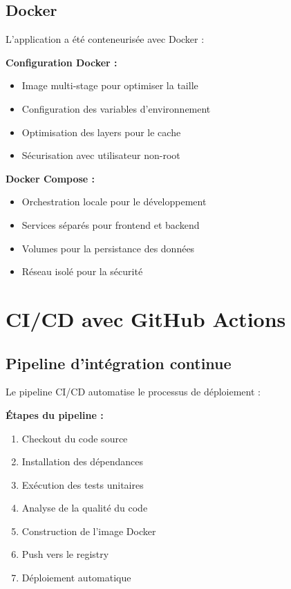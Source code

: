 \subsection{Docker}

L'application a été conteneurisée avec Docker :

\textbf{Configuration Docker :}
\begin{itemize}
    \item Image multi-stage pour optimiser la taille
    \item Configuration des variables d'environnement
    \item Optimisation des layers pour le cache
    \item Sécurisation avec utilisateur non-root
\end{itemize}

\textbf{Docker Compose :}
\begin{itemize}
    \item Orchestration locale pour le développement
    \item Services séparés pour frontend et backend
    \item Volumes pour la persistance des données
    \item Réseau isolé pour la sécurité
\end{itemize}

\section{CI/CD avec GitHub Actions}

\subsection{Pipeline d'intégration continue}

Le pipeline CI/CD automatise le processus de déploiement :

\textbf{Étapes du pipeline :}
\begin{enumerate}
    \item Checkout du code source
    \item Installation des dépendances
    \item Exécution des tests unitaires
    \item Analyse de la qualité du code
    \item Construction de l'image Docker
    \item Push vers le registry
    \item Déploiement automatique
\end{enumerate}

